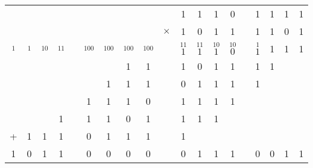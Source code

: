 \documentclass[12pt, A4]{article}
\begin{document}
\begin{enumerate}
\begin{tasks}
								\begin{tabular}{*{19}{c@{\,}}}
									& & & & & & & & & &  1& 1 & 1 & 0 && 1 & 1 & 1 & 1 \\
									& & & & & & & & & \(\times\) & 1 & 0 & 1 & 1 && 1 & 1 & 0 & 1 \\\hline
									\(\overset{1}{}\) & \(\overset{1}{}\) & \(\overset{10}{}\) & \(\overset{11}{}\) && \(\overset{100}{}\) & \(\overset{100}{}\) & \(\overset{100}{}\) & \(\overset{100}{}\) && \(\overset{11}{1}\) & \(\overset{11}{1}\) & \(\overset{10}{1}\) & \(\overset{10}{0}\) && \(\overset{1}{1}\) & 1 & 1 & 1 \\
									& & & & & & & 1 & 1 && 1 & 0 & 1 & 1 && 1 & 1 \\
									& & & & & & 1 & 1 & 1 && 0 & 1 & 1 & 1 && 1 \\
									& & & & & 1 & 1 & 1 & 0 && 1 & 1 & 1 & 1 \\
									& & & 1 && 1 & 1 & 0 & 1 && 1 & 1 & 1 \\
									+ & 1 & 1 & 1 && 0 & 1 & 1 & 1 && 1 \\\hline
									1 & 0 & 1 & 1 && 0 & 0 & 0 & 0 && 0 & 1 & 1 & 1 && 0 & 0 & 1 & 1
								\end{tabular}
							\task
								

\end{tasks}
\end{enumerate}
\end{document}
